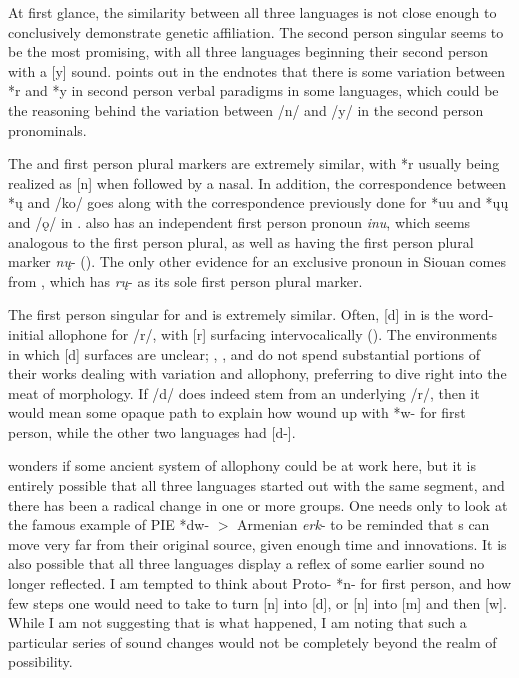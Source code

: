 \documentclass[output=paper]{LSP/langsci}
\begin{document}
At first glance, the similarity between all three languages is not close enough to conclusively demonstrate genetic affiliation. The second person singular seems to be the most promising, with all three languages beginning their second person with a [y] sound. \citet{Rankin1998scy} points out in the endnotes that there is some variation between *r and *y in second person verbal paradigms in some languages, which could be the reasoning behind the variation between /n/ and /y/ in the second person  pronominals.

The  and  first person plural markers are extremely similar, with *r usually being realized as [n] when followed by a nasal. In addition, the correspondence between *\k{u} and /k{o}/ goes along with the correspondence previously done for *uu and *\k{u}\k{u} and /\k{o}/ in .  also has an independent first person pronoun \emph{inu}, which seems analogous to the first person plural, as well as having the first person plural  marker \emph{n\k{u}}- (\citealt{Voorhis1984}). The only other evidence for an exclusive pronoun in Siouan comes from , which has \emph{r\k{u}}- as its sole first person plural marker. 

The first person singular for  and  is extremely similar. Often, [d] in  is the word-initial allophone for /r/, with [r] surfacing intervocalically (\citealt{Rudes2007}). The environments in which  [d] surfaces are unclear; \citet{Gatschet1885}, \citet{Wagner1934}, and \citet{Linn2000} do not spend substantial portions of their works dealing with variation and allophony, preferring to dive right into the meat of morphology. If  /d/ does indeed stem from an underlying /r/, then it would mean some opaque path to explain how  wound up with *w- for first person, while the other two languages had [d-]. 

\citet{Rankin1998scy} wonders if some ancient system of allophony could be at work here, but it is entirely possible that all three languages started out with the same segment, and there has been a radical change in one or more groups. One needs only to look at the famous example of PIE *dw- $>$ Armenian \emph{erk}- to be reminded that s can move very far from their original source, given enough time and innovations. It is also possible that all three languages display a reflex of some earlier sound no longer reflected. I am tempted to think about Proto- *n- for first person, and how few steps one would need to take to turn [n] into [d], or [n] into [m] and then [w]. While I am not suggesting that is what happened, I am noting that such a particular series of sound changes would not be completely beyond the realm of possibility.
\end{document}
